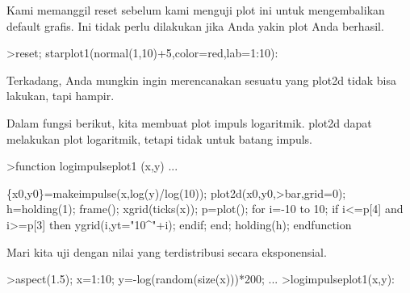 \documentclass[a4paper,10pt]{article}
\begin{document}
\begin{eulernotebook}
\begin{eulercomment}
\begin{eulercomment}
\begin{eulercomment}
\begin{eulercomment}
\begin{eulercomment}
\begin{eulercomment}
\begin{eulercomment}
\begin{eulercomment}
\begin{eulercomment}
\begin{eulercomment}
\begin{eulercomment}
\begin{eulercomment}
\begin{eulercomment}
\begin{eulercomment}
\begin{eulercomment}
\begin{eulercomment}
\begin{eulercomment}
\begin{eulercomment}
\begin{eulercomment}
\begin{eulercomment}
\begin{eulercomment}
\begin{eulercomment}
\begin{eulercomment}
\begin{eulercomment}
\begin{eulercomment}
\begin{eulercomment}
\begin{eulercomment}
\begin{eulercomment}
\begin{eulercomment}
\begin{eulercomment}
\begin{eulercomment}
\begin{eulercomment}
\begin{eulercomment}
\begin{eulercomment}
\begin{eulercomment}
\begin{eulercomment}
\begin{eulercomment}
Kami memanggil reset sebelum kami menguji plot ini untuk mengembalikan
default grafis. Ini tidak perlu dilakukan jika Anda yakin plot Anda
berhasil.
\end{eulercomment}
\begin{eulerprompt}
>reset; starplot1(normal(1,10)+5,color=red,lab=1:10):
\end{eulerprompt}
\begin{eulercomment}
Terkadang, Anda mungkin ingin merencanakan sesuatu yang plot2d tidak
bisa lakukan, tapi hampir.

Dalam fungsi berikut, kita membuat plot impuls logaritmik. plot2d
dapat melakukan plot logaritmik, tetapi tidak untuk batang impuls.
\end{eulercomment}
\begin{eulerprompt}
>function logimpulseplot1 (x,y) ...
\end{eulerprompt}
\begin{eulerudf}
  \{x0,y0\}=makeimpulse(x,log(y)/log(10));
    plot2d(x0,y0,>bar,grid=0);
    h=holding(1);
    frame();
    xgrid(ticks(x));
    p=plot();
    for i=-10 to 10;
      if i<=p[4] and i>=p[3] then
         ygrid(i,yt="10^"+i);
      endif;
    end;
    holding(h);
  endfunction
\end{eulerudf}
\begin{eulercomment}
Mari kita uji dengan nilai yang terdistribusi secara eksponensial.
\end{eulercomment}
\begin{eulerprompt}
>aspect(1.5); x=1:10; y=-log(random(size(x)))*200; ...
>logimpulseplot1(x,y):
\end{eulerprompt}

\end{eulercomment}
\end{eulercomment}
\end{eulercomment}
\end{eulercomment}
\end{eulercomment}
\end{eulercomment}
\end{eulercomment}
\end{eulercomment}
\end{eulercomment}
\end{eulercomment}
\end{eulercomment}
\end{eulercomment}
\end{eulercomment}
\end{eulercomment}
\end{eulercomment}
\end{eulercomment}
\end{eulercomment}
\end{eulercomment}
\end{eulercomment}
\end{eulercomment}
\end{eulercomment}
\end{eulercomment}
\end{eulercomment}
\end{eulercomment}
\end{eulercomment}
\end{eulercomment}
\end{eulercomment}
\end{eulercomment}
\end{eulercomment}
\end{eulercomment}
\end{eulercomment}
\end{eulercomment}
\end{eulercomment}
\end{eulercomment}
\end{eulercomment}
\end{eulercomment}
\end{eulernotebook}
\end{document}
